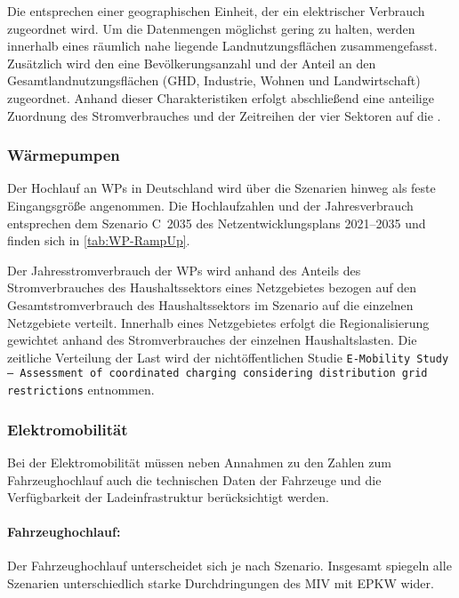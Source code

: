 Die \Lastgebiete entsprechen einer geographischen Einheit, der ein elektrischer Verbrauch zugeordnet wird.
Um die Datenmengen möglichst gering zu halten, werden innerhalb eines \Lastgebietes räumlich nahe liegende Landnutzungsflächen zusammengefasst.
Zusätzlich wird den \Lastgebieten eine Bevölkerungsanzahl und der Anteil an den Gesamtlandnutzungsflächen (\gls{GHD}, Industrie, Wohnen und Landwirtschaft) zugeordnet.
Anhand dieser Charakteristiken erfolgt abschließend eine anteilige Zuordnung des Stromverbrauches und der Zeitreihen der vier Sektoren auf die \Lastgebietedot.


\subsubsection{Wärmepumpen}

Der Hochlauf an \glspl{WP} in Deutschland wird über die Szenarien hinweg als feste Eingangsgröße angenommen.
Die Hochlaufzahlen und der Jahresverbrauch entsprechen dem Szenario C~\num{2035} des Netzentwicklungsplans \numrange[range-phrase=~{--}~]{2021}{2035} \cite{BNetzA2020} und finden sich in \autoref{tab:WP-RampUp}.



Der Jahresstromverbrauch der \glspl{WP} wird anhand des Anteils des Stromverbrauches des Haushaltssektors eines Netzgebietes bezogen auf den Gesamtstromverbrauch des Haushaltssektors im Szenario \ego auf die einzelnen Netzgebiete verteilt.
Innerhalb eines Netzgebietes erfolgt die Regionalisierung gewichtet anhand des Stromverbrauches der einzelnen Haushaltslasten.
Die zeitliche Verteilung der Last wird der nichtöffentlichen Studie \texttt{E-Mobility Study {--} Assessment of coordinated charging considering distribution grid restrictions} \cite{Schachler} entnommen.


\subsubsection{Elektromobilität}\label{chap:EMob_Szenarien}

Bei der Elektromobilität müssen neben Annahmen zu den Zahlen zum Fahrzeughochlauf auch die technischen Daten der Fahrzeuge und die Verfügbarkeit der Ladeinfrastruktur berücksichtigt werden.


\paragraph{Fahrzeughochlauf:}
Der Fahrzeughochlauf unterscheidet sich je nach Szenario.
Insgesamt spiegeln alle Szenarien unterschiedlich starke Durchdringungen des \gls{MIV} mit \gls{EPKW} wider.\medskip

